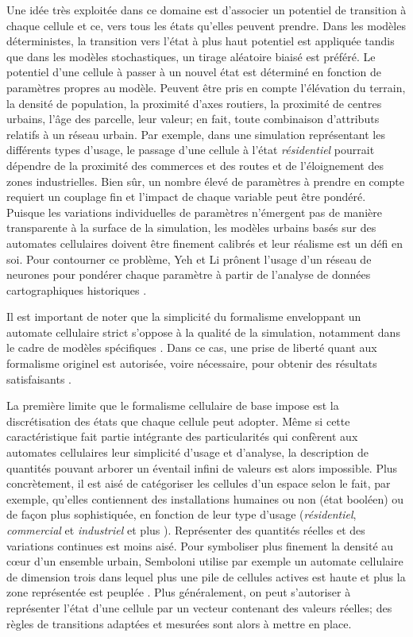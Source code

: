 \documentclass[12pt]{article}
\begin{document}
Une idée très exploitée dans ce domaine est d'associer un potentiel de
transition à chaque cellule et ce, vers tous les états qu'elles
peuvent prendre. Dans les modèles déterministes, la transition vers
l'état à plus haut potentiel est appliquée tandis que dans les modèles
stochastiques, un tirage aléatoire biaisé est préféré. Le potentiel
d'une cellule à passer à un nouvel état est déterminé en fonction de
paramètres propres au modèle. Peuvent être pris en compte l'élévation
du terrain, la densité de population, la proximité d'axes routiers, la
proximité de centres urbains, l'âge des parcelle, leur valeur; en
fait, toute combinaison d'attributs relatifs à un réseau urbain. Par
exemple, dans une simulation représentant les différents types
d'usage, le passage d'une cellule à l'état \textit{résidentiel}
pourrait dépendre de la proximité des commerces et des routes et de
l'éloignement des zones industrielles. Bien sûr, un nombre élevé de
paramètres à prendre en compte requiert un couplage fin et l'impact de
chaque variable peut être pondéré. Puisque les variations
individuelles de paramètres n'émergent pas de manière transparente à
la surface de la simulation, les modèles urbains basés sur des
automates cellulaires doivent être finement calibrés et leur réalisme
est un défi en soi. Pour contourner ce problème, Yeh et Li prônent
l'usage d'un réseau de neurones pour pondérer chaque paramètre à
partir de l'analyse de données cartographiques historiques
\cite{Yeh2002}.

Il est important de noter que la simplicité du formalisme enveloppant
un automate cellulaire strict s'oppose à la qualité de la simulation,
notamment dans le cadre de modèles spécifiques
\cite{Torrens2001}. Dans ce cas, une prise de liberté quant aux
formalisme originel est autorisée, voire nécessaire, pour obtenir des
résultats satisfaisants \cite{White1998}.

La première limite que le formalisme cellulaire de base impose est la
discrétisation des états que chaque cellule peut adopter. Même si
cette caractéristique fait partie intégrante des particularités qui
confèrent aux automates cellulaires leur simplicité d'usage et
d'analyse, la description de quantités pouvant arborer un éventail
infini de valeurs est alors impossible. Plus concrètement, il est aisé
de catégoriser les cellules d'un espace selon le fait, par exemple,
qu'elles contiennent des installations humaines ou non (état booléen)
\cite{Benguigui2004,Cornu2008} ou de façon plus sophistiquée, en fonction
de leur type d'usage (\textit{résidentiel}, \textit{commercial} et
\textit{industriel} \cite{Lechner} et plus
\cite{Dubos-Paillard2003}). Représenter des quantités réelles et des
variations continues est moins aisé. Pour symboliser plus finement la
densité au c\oe ur d'un ensemble urbain, Semboloni utilise par exemple
un automate cellulaire de dimension trois dans lequel plus une pile de
cellules actives est haute et plus la zone représentée est peuplée
\cite{Semboloni2000}. Plus généralement, on peut s'autoriser à
représenter l'état d'une cellule par un vecteur contenant des valeurs
réelles; des règles de transitions adaptées et mesurées sont alors à
mettre en place.
\end{document}
